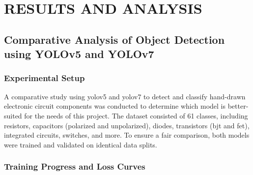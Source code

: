 \chapter{RESULTS AND ANALYSIS}




\section{Comparative Analysis of Object Detection using YOLOv5 and YOLOv7}

\subsection{Experimental Setup}

A comparative study using \gls{yolo}v5 and \gls{yolo}v7 to detect and classify hand-drawn electronic circuit components was conducted to determine which model is better-suited for the needs of this project. The dataset consisted of 61 classes, including resistors, capacitors (polarized and unpolarized), diodes, transistors (\gls{bjt} and \gls{fet}), integrated circuits, switches, and more. To ensure a fair comparison, both models were trained and validated on identical data splits.

\subsection{Training Progress and Loss Curves}

